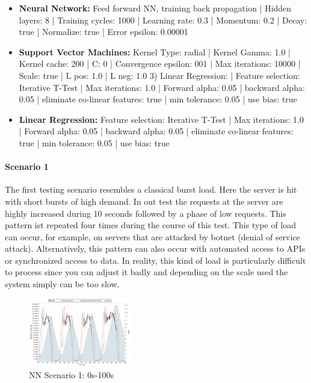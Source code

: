 \begin{itemize}
\item \textbf{Neural Network:} Feed forward NN, training back propagation | Hidden layers: 8 | Training cycles: 1000 | Learning rate: 0.3 | Momentum: 0.2 | Decay: true | Normalize: true | Error epsilon: 0.00001
\item \textbf{Support Vector Machines:} Kernel Type: radial | Kernel Gamma: 1.0 | Kernel cache: 200 | C: 0 | Convergence epsilon: 001 | Max iterations: 10000 | Scale: true | L pos: 1.0 | L neg: 1.0 3) Linear Regression: | Feature selection: Iterative T-Test | Max iterations: 1.0 | Forward alpha: 0.05 | backward alpha: 0.05 | eliminate co-linear features: true | min tolerance: 0.05 | use bias: true 
\item \textbf{Linear Regression:} Feature selection: Iterative T-Test | Max iterations: 1.0 | Forward alpha: 0.05 | backward alpha: 0.05 | eliminate co-linear features: true | min tolerance: 0.05 | use bias: true 
\end{itemize}


\paragraph*{Scenario 1}
The first testing scenario resembles a classical burst load. Here the server is hit with short bursts of high demand. In out test the requests at the server are highly increased during 10 seconds followed by a phase of low requests. This pattern ist repeated four times during the course of this test. This type of load can occur, for example, on servers that are attacked by botnet (denial of service attack). Alternatively, this pattern can also occur with automated access to APIs or synchronized access to data. In reality, this kind of load is particularly difficult to process since you can adjust it badly and depending on the scale used the system simply can be too slow.


\begin{figure}[ht]
	\begin{center}
		\includegraphics[width=0.40\textwidth]{chapters/chapter5/fig/NN1_1}
	\end{center}
	\caption{NN Scenario 1: 0s-100s}
	\label{fig:NN1_1}
\end{figure}

